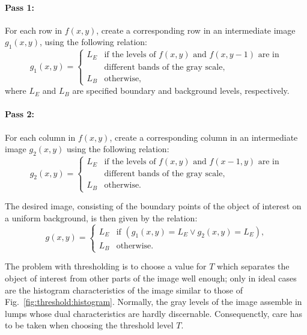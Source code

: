 \paragraph{Pass 1:} For each row in $f(x,y)$, create a corresponding
row in an intermediate image $g_{1}(x,y)$, using the following
relation: 
\begin{equation}
  g_{1}(x,y)=\left\{
    \begin{array}{ll}
      L_{E} & \mbox{if the levels of $f(x,y)$ and $f(x,y-1)$ are in} \\
            & \mbox{different bands of the gray scale,} \\
      L_{B} & \mbox{otherwise,}
    \end{array}\right.
\end{equation}
where $L_{E}$ and $L_{B}$ are specified boundary and background
levels, respectively.

\paragraph{Pass 2:} For each column in $f(x,y)$, create a
corresponding column in an intermediate image $g_{2}(x,y)$ using the
following relation:
\begin{equation}
  g_{2}(x,y)=\left\{
    \begin{array}{ll}
      L_{E} & \mbox{if the levels of $f(x,y)$ and $f(x-1,y)$ are in} \\
            & \mbox{different bands of the gray scale,} \\
      L_{B} & \mbox{otherwise.}
    \end{array}\right.
\end{equation}

The desired image, consisting of the boundary points of the object of
interest on a uniform background, is then given by the relation:
\begin{equation}
  g(x,y)=\left\{
    \begin{array}{ll}
      L_{E} & \mbox{if $(g_{1}(x,y)=L_{E}\vee g_{2}(x,y)=L_{E})$,} \\
      L_{B} & \mbox{otherwise.}
    \end{array}\right.
\end{equation}

The problem with thresholding is to choose a value for $T$ which
separates the object of interest from other parts of the image well
enough; only in ideal cases are the histogram characteristics of the
image similar to those of Fig.~\ref{fig:threshold:histogram}.
Normally, the gray levels of the image assemble in lumps whose dual
characteristics are hardly discernable.  Consequenctly, care has to be
taken when choosing the threshold level $T$.

